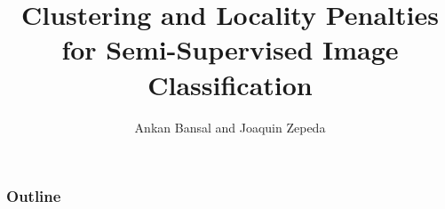 \documentclass{beamer}
\title{Clustering and Locality Penalties for Semi-Supervised Image Classification}
\author{Ankan Bansal and Joaquin Zepeda}
\date{}
\begin{document}
\maketitle

\begin{frame}
	\frametitle{Outline}
	\tableofcontents
\end{frame}





\end{document}
